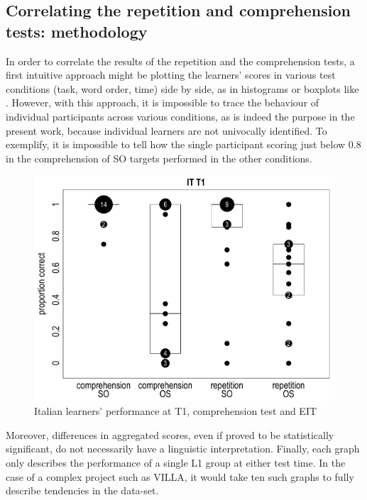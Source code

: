 \subsection{Correlating the repetition and comprehension tests: methodology}\label{sec:06:2.1}

In order to correlate the results of the repetition and the comprehension tests, a first intuitive approach might be plotting the learners' scores in various test conditions (task, word order, time) side by side, as in histograms or boxplots like . However, with this approach, it is impossible to trace the behaviour of individual participants across various conditions, as is indeed the purpose in the present work, because individual learners are not univocally identified. To exemplify, it is impossible to tell how the single participant scoring just below 0.8 in the comprehension of SO targets performed in the other conditions.

\begin{figure}
    \includegraphics[width=\textwidth]{figures/06-1.pdf}
    \caption{Italian learners’ performance at T1, comprehension test and EIT}
    \label{fig:06:1}
\end{figure}

Moreover, differences in aggregated scores, even if proved to be statistically significant, do not necessarily have a linguistic interpretation. Finally, each graph only describes the performance of a single L1 group at either test time. In the case of a complex project such as VILLA, it would take ten such graphs to fully describe tendencies in the data-set.

